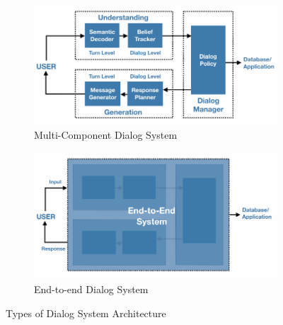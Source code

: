 \begin{figure}
\centering
\begin{subfigure}{\textwidth}
 \includegraphics[width=\linewidth]{assets/figures/components.pdf}
 \caption{Multi-Component Dialog System}\label{fig:systemfull}
\end{subfigure}

\vspace*{0.5in}

\begin{subfigure}{\textwidth}
 \includegraphics[width=\linewidth]{assets/figures/end2end.pdf}
 \caption{End-to-end Dialog System}\label{fig:end2end}
\end{subfigure}
\caption{Types of Dialog System Architecture}
\end{figure}

